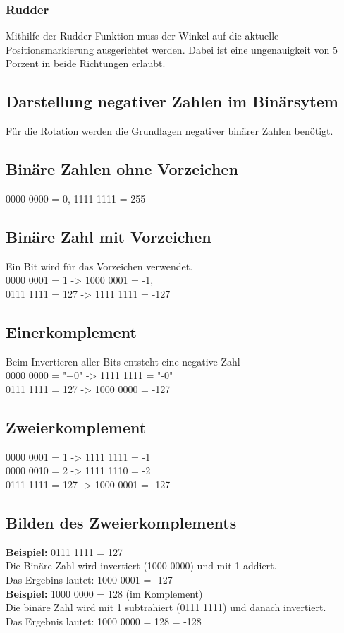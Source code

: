     \subsubsection{Rudder}
    Mithilfe der Rudder Funktion muss der Winkel auf die aktuelle Positionsmarkierung ausgerichtet werden. Dabei ist eine ungenauigkeit von 5 Porzent in beide Richtungen erlaubt.

    \subsection*{Darstellung negativer Zahlen im Binärsytem}
    Für die Rotation werden die Grundlagen negativer binärer Zahlen benötigt.

    \subsection*{Binäre Zahlen ohne Vorzeichen}
    0000 0000 = 0, 1111 1111 = 255
    \subsection*{Binäre Zahl mit Vorzeichen}
    Ein Bit wird für das Vorzeichen verwendet. \\
    0000 0001 = 1 -> 1000 0001 = -1, \\
    0111 1111 = 127 -> 1111 1111 = -127
    \subsection*{Einerkomplement}
    Beim Invertieren aller Bits entsteht eine negative Zahl \\
    0000 0000 = "+0" -> 1111 1111 = "-0" \\
    0111 1111 = 127 -> 1000 0000 = -127
    \subsection*{Zweierkomplement}
    0000 0001 = 1 -> 1111 1111 = -1 \\
    0000 0010 = 2 -> 1111 1110 = -2 \\
    0111 1111 = 127 -> 1000 0001 = -127
    \subsection*{Bilden des Zweierkomplements}
    \textbf{Beispiel:} 0111 1111 = 127 \\
    Die Binäre Zahl wird invertiert (1000 0000) und mit 1 addiert. \\
    Das Ergebins lautet: 1000 0001 = -127 \\
    \textbf{Beispiel:} 1000 0000 = 128 (im Komplement) \\
    Die binäre Zahl wird mit 1 subtrahiert (0111 1111) und danach invertiert. \\
    Das Ergebnis lautet: 1000 0000 = 128 = -128 \\

